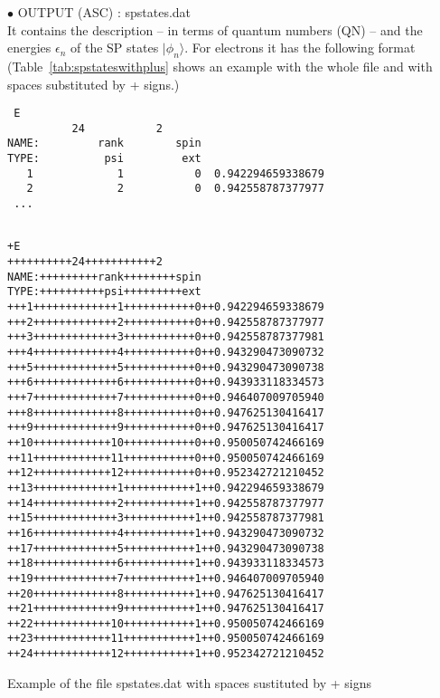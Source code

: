 \documentclass[12pt,twoside]{article}
\begin{document}
$\bullet$ \textsf{OUTPUT (ASC) : spstates.dat} 
\\ 
It contains the description -- in terms of quantum numbers (QN) -- and
the energies $\epsilon_n$ of the SP states $|\phi_n\rangle$.  For
electrons it has the following format (Table~\ref{tab:spstateswithplus}
shows an example with the whole file and with spaces substituted by
\textsf{+} signs.)
\begin{verbatim}
 E
          24           2
NAME:         rank        spin
TYPE:          psi         ext
   1             1           0  0.942294659338679
   2             2           0  0.942558787377977
 ...
\end{verbatim}


\begin{table}
\begin{alltt}
\ \\
+E 
++++++++++24+++++++++++2 
NAME:+++++++++rank++++++++spin
TYPE:++++++++++psi+++++++++ext
+++1+++++++++++++1+++++++++++0++0.942294659338679
+++2+++++++++++++2+++++++++++0++0.942558787377977
+++3+++++++++++++3+++++++++++0++0.942558787377981
+++4+++++++++++++4+++++++++++0++0.943290473090732
+++5+++++++++++++5+++++++++++0++0.943290473090738
+++6+++++++++++++6+++++++++++0++0.943933118334573
+++7+++++++++++++7+++++++++++0++0.946407009705940
+++8+++++++++++++8+++++++++++0++0.947625130416417
+++9+++++++++++++9+++++++++++0++0.947625130416417
++10++++++++++++10+++++++++++0++0.950050742466169
++11++++++++++++11+++++++++++0++0.950050742466169
++12++++++++++++12+++++++++++0++0.952342721210452
++13+++++++++++++1+++++++++++1++0.942294659338679
++14+++++++++++++2+++++++++++1++0.942558787377977
++15+++++++++++++3+++++++++++1++0.942558787377981
++16+++++++++++++4+++++++++++1++0.943290473090732
++17+++++++++++++5+++++++++++1++0.943290473090738
++18+++++++++++++6+++++++++++1++0.943933118334573
++19+++++++++++++7+++++++++++1++0.946407009705940
++20+++++++++++++8+++++++++++1++0.947625130416417
++21+++++++++++++9+++++++++++1++0.947625130416417
++22++++++++++++10+++++++++++1++0.950050742466169
++23++++++++++++11+++++++++++1++0.950050742466169
++24++++++++++++12+++++++++++1++0.952342721210452
\end{alltt}
\caption{Example of the file \textsf{spstates.dat} with spaces
sustituted by \textsf{+} signs} 
\label{tab:spstateswithplus}
\end{table}
\end{document}
